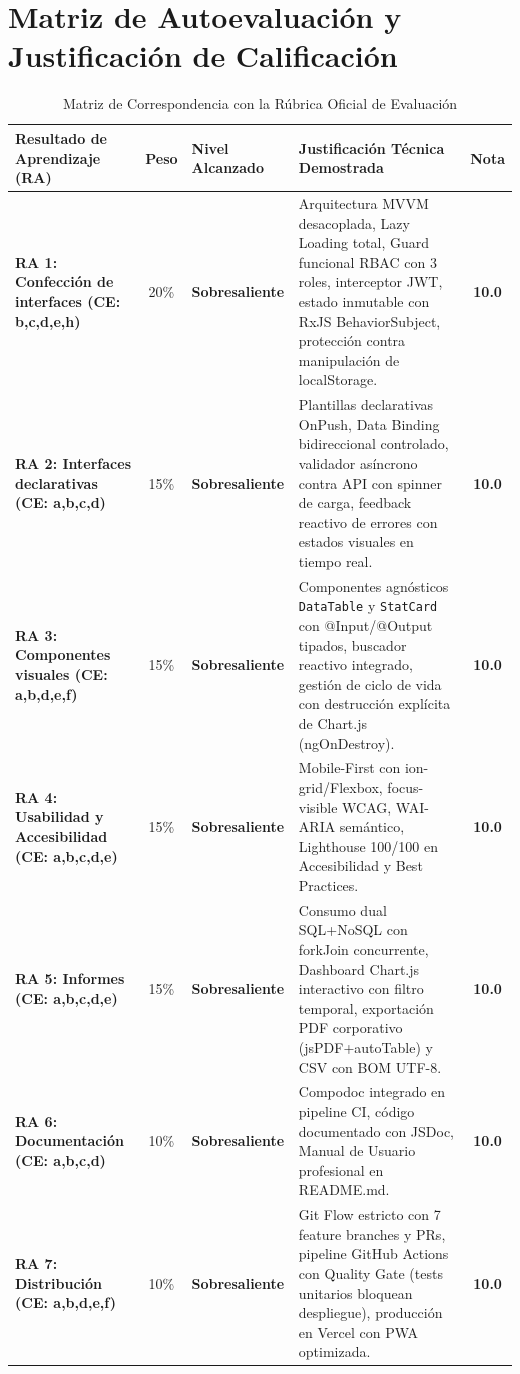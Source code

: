 \documentclass[11pt,a4paper]{article}
\begin{document}
\section{Matriz de Autoevaluación y Justificación de Calificación}
\label{sec:rubrica}

\begin{table}[h!]
\centering
\small
\begin{tabularx}{\textwidth}{p{3.2cm} c p{2.2cm} X c}
\toprule
\textbf{Resultado de Aprendizaje (RA)} & \textbf{Peso} & \textbf{Nivel Alcanzado} & \textbf{Justificación Técnica Demostrada} & \textbf{Nota} \\
\midrule
\textbf{RA 1: Confección de interfaces (CE: b,c,d,e,h)} & 20\% & \textbf{Sobresaliente} & Arquitectura MVVM desacoplada, Lazy Loading total, Guard funcional RBAC con 3 roles, interceptor JWT, estado inmutable con RxJS BehaviorSubject, protección contra manipulación de localStorage. & \textbf{10.0} \\
\midrule
\textbf{RA 2: Interfaces declarativas (CE: a,b,c,d)} & 15\% & \textbf{Sobresaliente} & Plantillas declarativas OnPush, Data Binding bidireccional controlado, validador asíncrono contra API con spinner de carga, feedback reactivo de errores con estados visuales en tiempo real. & \textbf{10.0} \\
\midrule
\textbf{RA 3: Componentes visuales (CE: a,b,d,e,f)} & 15\% & \textbf{Sobresaliente} & Componentes agnósticos \texttt{DataTable} y \texttt{StatCard} con @Input/@Output tipados, buscador reactivo integrado, gestión de ciclo de vida con destrucción explícita de Chart.js (ngOnDestroy). & \textbf{10.0} \\
\midrule
\textbf{RA 4: Usabilidad y Accesibilidad (CE: a,b,c,d,e)} & 15\% & \textbf{Sobresaliente} & Mobile-First con ion-grid/Flexbox, focus-visible WCAG, WAI-ARIA semántico, Lighthouse 100/100 en Accesibilidad y Best Practices. & \textbf{10.0} \\
\midrule
\textbf{RA 5: Informes (CE: a,b,c,d,e)} & 15\% & \textbf{Sobresaliente} & Consumo dual SQL+NoSQL con forkJoin concurrente, Dashboard Chart.js interactivo con filtro temporal, exportación PDF corporativo (jsPDF+autoTable) y CSV con BOM UTF-8. & \textbf{10.0} \\
\midrule
\textbf{RA 6: Documentación (CE: a,b,c,d)} & 10\% & \textbf{Sobresaliente} & Compodoc integrado en pipeline CI, código documentado con JSDoc, Manual de Usuario profesional en README.md. & \textbf{10.0} \\
\midrule
\textbf{RA 7: Distribución (CE: a,b,d,e,f)} & 10\% & \textbf{Sobresaliente} & Git Flow estricto con 7 feature branches y PRs, pipeline GitHub Actions con Quality Gate (tests unitarios bloquean despliegue), producción en Vercel con PWA optimizada. & \textbf{10.0} \\
\bottomrule
\end{tabularx}
\caption{Matriz de Correspondencia con la Rúbrica Oficial de Evaluación}
\end{table}
\end{document}
